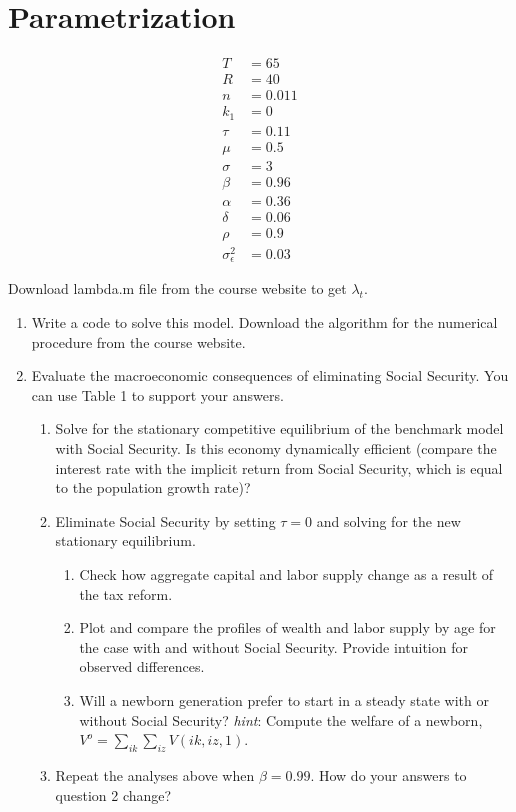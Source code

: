 \documentclass[10pt,a4paper]{article}
\begin{document}
\section*{Parametrization}
\begin{align*}
T &= 65\\
R &= 40\\
n &= 0.011\\
k_1 &= 0\\
\tau &= 0.11\\
\mu &= 0.5\\
\sigma &= 3\\
\beta &= 0.96\\
\alpha &= 0.36\\
\delta &= 0.06\\
\rho &= 0.9\\
\sigma_{\epsilon}^2 &= 0.03
\end{align*}

Download lambda.m file from the course website to get $\lambda_t$.

\begin{enumerate}
    \item Write a code to solve this model. Download the algorithm for the numerical procedure from the course website.
    
    \item Evaluate the macroeconomic consequences of eliminating Social Security. You can use Table 1 to support your answers.
    \begin{enumerate}
        \item Solve for the stationary competitive equilibrium of the benchmark model with Social Security. Is this economy dynamically efficient (compare the interest rate with the implicit return from Social Security, which is equal to the population growth rate)?
        
        \item Eliminate Social Security by setting $\tau = 0$ and solving for the new stationary equilibrium.
        \begin{enumerate}
            \item Check how aggregate capital and labor supply change as a result of the tax reform.
            
            \item Plot and compare the profiles of wealth and labor supply by age for the case with and without Social Security. Provide intuition for observed differences.
            
            \item Will a newborn generation prefer to start in a steady state with or without Social Security? \textit{hint}: Compute the welfare of a newborn, $V^o = \sum_{ik}\sum_{iz} V(ik, iz, 1)$.
        \end{enumerate}
        
        \item Repeat the analyses above when $\beta = 0.99$. How do your answers to question 2 change?
    \end{enumerate}
\end{enumerate}
\end{document}
